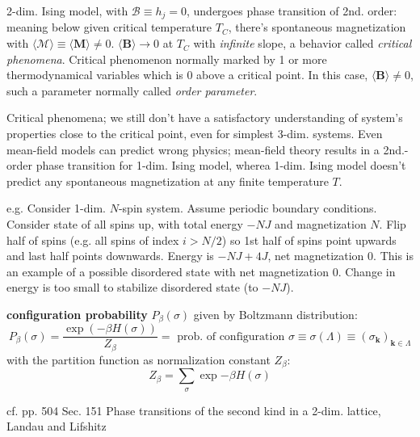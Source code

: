2-dim. Ising model, with $\mathcal{B} \equiv h_j =0$, undergoes phase transition of 2nd. order: meaning below given critical temperature $T_C$, there's spontaneous magnetization with $\langle \mathcal{M} \rangle \equiv \langle \mathbf{M} \rangle \neq 0$.  $\langle \mathbf{B} \rangle \to 0$ at $T_C$ with \emph{infinite} slope, a behavior called \emph{critical phenomena}.  Critical phenomenon normally marked by 1 or more thermodynamical variables which is 0 above a critical point.  In this case, $\langle \mathbf{B} \rangle \neq 0$, such a parameter normally called \emph{order parameter}.  

Critical phenomena; we still don't have a satisfactory understanding of system's properties close to the critical point, even for simplest 3-dim. systems.  Even mean-field models can predict wrong physics; mean-field theory results in a 2nd.-order phase transition for 1-dim. Ising model, wherea 1-dim. Ising model doesn't predict any spontaneous magnetization at any finite temperature $T$.  

e.g. Consider 1-dim. $N$-spin system.  Assume periodic boundary conditions.  Consider state of all spins up, with total energy $-NJ$ and magnetization $N$.  Flip half of spins (e.g. all spins of index $i>N/2$) so 1st half of spins point upwards and last half points downwards.  Energy is $-NJ + 4J$, net magnetization $0$.  This is an example of a possible disordered state with net magnetization $0$.  Change in energy is too small to stabilize disordered state (to $-NJ$).  

\begin{definition}
\textbf{configuration probability} $P_{\beta}(\sigma)$ given by Boltzmann distribution:  
\begin{equation}\label{agat:Eq:Isingconfigprob}
 P_{\beta}(\sigma) = \frac{ \exp{ (-\beta H(\sigma))} }{ Z_{\beta} } = \text{ prob. of configuration } \sigma \equiv \sigma(\Lambda) \equiv (\sigma_{\mathbf{k}})_{\mathbf{k} \in \Lambda}
\end{equation} with the partition function as normalization constant $Z_{\beta}$: 
\begin{equation}\label{agat:Eq:IsingPartitionFuncZ}
Z_{\beta} = \sum_{\sigma} \exp{ -\beta H(\sigma)}
\end{equation}
\end{definition}  



cf. pp. 504 Sec. 151 Phase transitions of the second kind in a 2-dim. lattice,  Landau and Lifshitz \cite{agat:LaLi1980}


